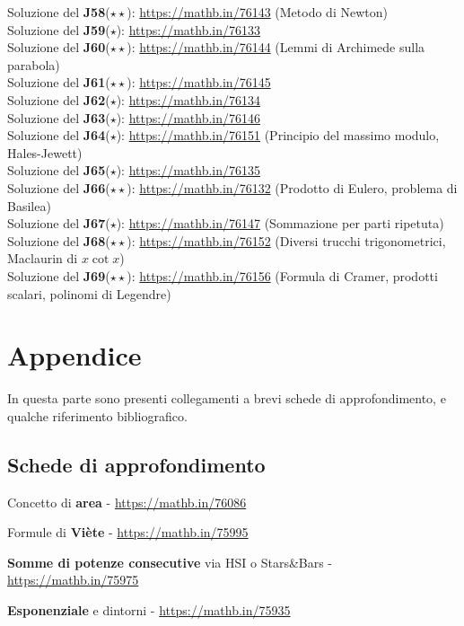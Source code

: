 \documentclass[a4paper,twoside]{article}
\theoremstyle{definition}
\numberwithin{theorem}{section}
\begin{document}
Soluzione del \textbf{J58}($\star\star$): \url{https://mathb.in/76143}  (Metodo di Newton)\\
Soluzione del \textbf{J59}($\star$): \url{https://mathb.in/76133} \\
Soluzione del \textbf{J60}($\star\star$): \url{https://mathb.in/76144} (Lemmi di Archimede sulla parabola)\\
Soluzione del \textbf{J61}($\star\star$): \url{https://mathb.in/76145} \\
Soluzione del \textbf{J62}($\star$): \url{https://mathb.in/76134} \\
Soluzione del \textbf{J63}($\star$): \url{https://mathb.in/76146} \\
Soluzione del \textbf{J64}($\star$): \url{https://mathb.in/76151} (Principio del massimo modulo, Hales-Jewett)\\
Soluzione del \textbf{J65}($\star$): \url{https://mathb.in/76135} \\
Soluzione del \textbf{J66}($\star\star$): \url{https://mathb.in/76132} (Prodotto di Eulero, problema di Basilea)\\
Soluzione del \textbf{J67}($\star$): \url{https://mathb.in/76147} (Sommazione per parti ripetuta)\\
Soluzione del \textbf{J68}($\star\star$): \url{https://mathb.in/76152} (Diversi trucchi trigonometrici, Maclaurin di $x\cot x$)\\
Soluzione del \textbf{J69}($\star\star$): \url{https://mathb.in/76156} (Formula di Cramer, prodotti scalari, polinomi di Legendre)\\

\newpage
\section{Appendice}
In questa parte sono presenti collegamenti a brevi schede di approfondimento, e qualche riferimento bibliografico.

\subsection{Schede di approfondimento}


Concetto di \textbf{area} - \url{https://mathb.in/76086}

Formule di \textbf{Viète} - \url{https://mathb.in/75995}

\textbf{Somme di potenze consecutive} via HSI o Stars\&Bars - \url{https://mathb.in/75975}

\textbf{Esponenziale} e dintorni - \url{https://mathb.in/75935}
\end{document}
